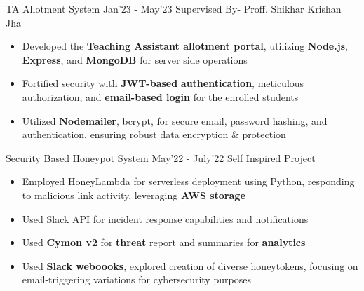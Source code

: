 \excventry
{TA Allotment System}
{Jan'23 - May'23}
{Supervised By- Proff. Shikhar Krishan Jha }
{
  \begin{itemize}
    \item  Developed the \textbf{Teaching Assistant allotment portal}, utilizing \textbf{Node.js}, \textbf{Express}, and \textbf{MongoDB} for server side operations
    \item Fortified security with \textbf{JWT-based} \textbf{authentication}, meticulous authorization, and \textbf{email-based login} for the enrolled students
    \item Utilized \textbf{Nodemailer}, bcrypt, for secure email, password hashing, and authentication, ensuring robust data encryption \& protection
  \end{itemize}
}


\excventry
{Security Based Honeypot System}
{May'22 - July'22}
{ \href{https://github.com/swayamg20/honeylambda}{\faGithub{}} Self Inspired Project}
{
  \begin{itemize}
  \item Employed HoneyLambda for serverless deployment using Python, responding to malicious link activity, leveraging \textbf{AWS storage}
  \item Used Slack API for incident response capabilities and  notifications
  \item Used \textbf{Cymon v2} for \textbf{threat} report and summaries for \textbf{analytics}
  \item Used \textbf{Slack weboooks}, explored creation of diverse honeytokens, focusing on email-triggering variations for cybersecurity purposes
  \end{itemize}
}

\vspace{-2mm}

